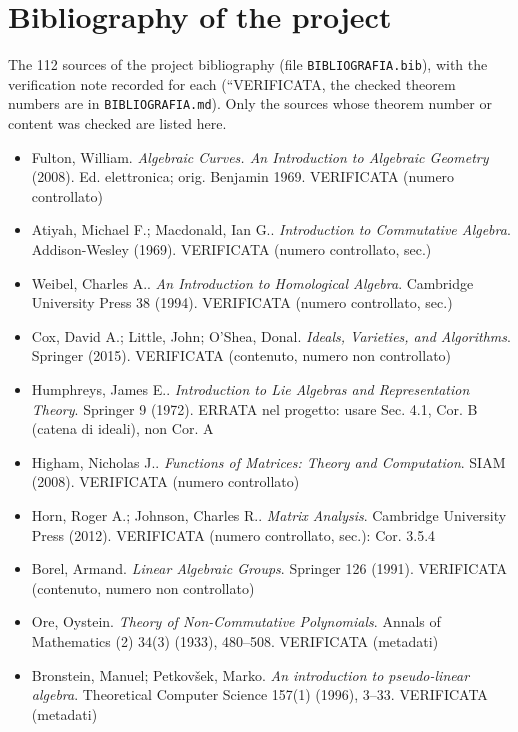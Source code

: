 \section{Bibliography of the project}\label{f:app:biblio}
The 112 sources of the project bibliography (file \texttt{BIBLIOGRAFIA.bib}), with the verification note recorded for each (``VERIFICATA, the checked theorem numbers are in \texttt{BIBLIOGRAFIA.md}). Only the sources whose theorem number or content was checked are listed here.
\begin{itemize}[itemsep=2pt,leftmargin=1.2em,font=\small]
\item Fulton, William. \emph{Algebraic Curves. An Introduction to Algebraic Geometry} (2008). \textsf{\footnotesize Ed. elettronica; orig. Benjamin 1969. VERIFICATA (numero controllato)}
\item Atiyah, Michael F.; Macdonald, Ian G.. \emph{Introduction to Commutative Algebra}. Addison-Wesley (1969). \textsf{\footnotesize VERIFICATA (numero controllato, sec.)}
\item Weibel, Charles A.. \emph{An Introduction to Homological Algebra}. Cambridge University Press 38 (1994). \textsf{\footnotesize VERIFICATA (numero controllato, sec.)}
\item Cox, David A.; Little, John; O'Shea, Donal. \emph{Ideals, Varieties, and Algorithms}. Springer (2015). \textsf{\footnotesize VERIFICATA (contenuto, numero non controllato)}
\item Humphreys, James E.. \emph{Introduction to Lie Algebras and Representation Theory}. Springer 9 (1972). \textsf{\footnotesize ERRATA nel progetto: usare Sec. 4.1, Cor. B (catena di ideali), non Cor. A}
\item Higham, Nicholas J.. \emph{Functions of Matrices: Theory and Computation}. SIAM (2008). \textsf{\footnotesize VERIFICATA (numero controllato)}
\item Horn, Roger A.; Johnson, Charles R.. \emph{Matrix Analysis}. Cambridge University Press (2012). \textsf{\footnotesize VERIFICATA (numero controllato, sec.): Cor. 3.5.4}
\item Borel, Armand. \emph{Linear Algebraic Groups}. Springer 126 (1991). \textsf{\footnotesize VERIFICATA (contenuto, numero non controllato)}
\item Ore, Oystein. \emph{Theory of Non-Commutative Polynomials}. Annals of Mathematics (2) 34(3) (1933), 480--508. \textsf{\footnotesize VERIFICATA (metadati)}
\item Bronstein, Manuel; Petkov{\v s}ek, Marko. \emph{An introduction to pseudo-linear algebra}. Theoretical Computer Science 157(1) (1996), 3--33. \textsf{\footnotesize VERIFICATA (metadati)}

\end{itemize}
